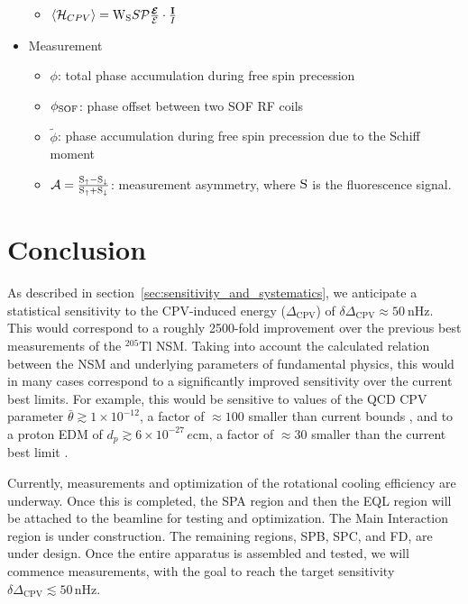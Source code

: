 \begin{itemize}
\begin{itemize}
        \item $\left\langle \mathcal{H}_{CPV} \right\rangle = {\rm W}_{\rm S} S \mathcal{P} \frac{\bm{\mathcal{E}}}{\mathcal{E}}\cdot\frac{\mathbf{I}}{I}$
    \end{itemize}
    \item Measurement
    \begin{itemize}
        \item $\phi$: total phase accumulation during free spin precession
        \item $\phi_{\rm SOF}$: phase offset between two SOF RF coils
        \item $\widetilde{\phi}$: phase accumulation during free spin precession due to the Schiff moment
        \item $\mathcal{A} = \frac{{\rm S}_\uparrow - {\rm S}_\downarrow}{{\rm S}_\uparrow + {\rm S}_\downarrow}$: measurement asymmetry, where ${\rm S}$ is the fluorescence signal.
    \end{itemize}
\end{itemize}
\section{Conclusion}
As described in section~\ref{sec:sensitivity_and_systematics}, we anticipate a statistical sensitivity to the CPV-induced energy ($\Delta_\mathrm{CPV}$) of $\delta \Delta_\mathrm{CPV} \approx  50~$nHz.  This would correspond to a roughly 2500-fold improvement over the previous best measurements of the $^{205}$Tl NSM.
Taking into account the calculated relation between the NSM and underlying parameters of fundamental physics, this would in many cases correspond to a significantly improved sensitivity over the current best limits.  For example, this would be sensitive to values of the QCD CPV parameter $\bar{\theta} \gtrsim 1 \times 10^{-12}$, a factor of $\approx 100$ smaller than current bounds \cite{abel2020measurement,graner2016reduced}, and to a proton EDM of $d_p \gtrsim 6\times 10^{-27}\,e$cm, a factor of $\approx 30$ smaller than the current best limit \cite{graner2016reduced}.

Currently, measurements and optimization of the rotational cooling efficiency are underway. Once this is completed, the SPA region and then the EQL region will be attached to the beamline for testing and optimization. The Main Interaction region is under construction. The remaining regions, SPB, SPC, and FD, are under design. Once the entire apparatus is assembled and tested, we will commence measurements, with the goal to reach the target sensitivity $\delta \Delta_\mathrm{CPV} \lesssim 50\,$nHz.

